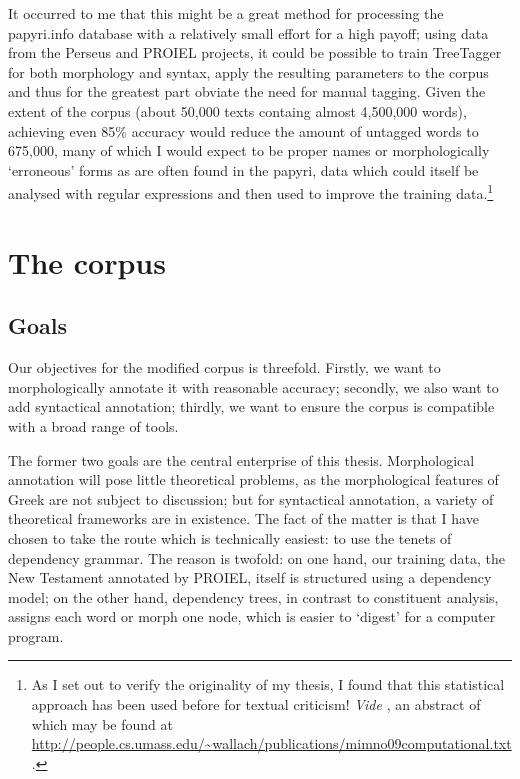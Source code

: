 \documentclass[10pt,a4paper,twoside,openright,titlepage,fleqn,%
               headinclude,,footinclude,BCOR5mm,%
               numbers=noenddot,cleardoublepage=empty,%
               tablecaptionabove]{scrbook}
\begin{document}
It occurred to me that this might be a great method for processing the
papyri.info database with a relatively small effort for a high payoff; using
data from the Perseus and PROIEL projects, it could be possible to train
TreeTagger for both morphology and syntax, apply the resulting parameters to
the corpus and thus for the greatest part obviate the need for manual tagging.
Given the extent of the corpus (about 50,000 texts containg almost 4,500,000
words), achieving even 85\% accuracy would reduce the amount of untagged words
to 675,000, many of which I would expect to be proper names or morphologically
`erroneous' forms as are often found in the papyri, data which could itself be
analysed with regular expressions and then used to improve the training
data.\footnote{As I set out to verify the originality of my thesis, I found
  that this statistical approach has been used before for textual criticism!
  \textit{Vide} \citet{mimno2009}, an abstract of which may be found at
  \url{http://people.cs.umass.edu/~wallach/publications/mimno09computational.txt}.}

\chapter{The corpus}
\label{chp:design}
\minitoc\mtcskip
\section{Goals}

Our objectives for the modified corpus is threefold. Firstly, we want to
morphologically annotate it with reasonable accuracy; secondly, we also want to
add syntactical annotation; thirdly, we want to ensure the corpus is compatible
with a broad range of tools.

The former two goals are the central enterprise of this thesis. Morphological
annotation will pose little theoretical problems, as the morphological features
of Greek are not subject to discussion; but for syntactical annotation, a
variety of theoretical frameworks are in existence. The fact of the matter is
that I have chosen to take the route which is technically easiest: to use the
tenets of dependency grammar. The reason is twofold: on one hand, our training
data, the New Testament annotated by PROIEL, itself is structured using a
dependency model; on the other hand, dependency trees, in contrast to
constituent analysis, assigns each word or morph one node, which is easier to
`digest' for a computer program.
\end{document}
